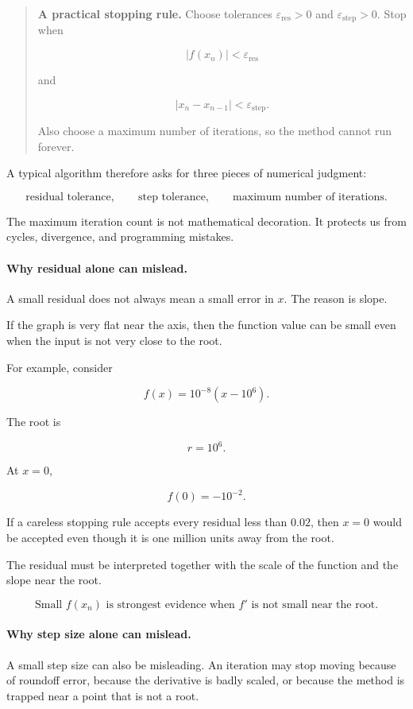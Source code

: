 \begin{quote}
\textbf{A practical stopping rule.}
Choose tolerances \(\varepsilon_{\text{res}}>0\) and \(\varepsilon_{\text{step}}>0\).  Stop when

\[
|f(x_n)|<\varepsilon_{\text{res}}
\]

and

\[
|x_n-x_{n-1}|<\varepsilon_{\text{step}}.
\]

Also choose a maximum number of iterations, so the method cannot run forever.
\end{quote}

A typical algorithm therefore asks for three pieces of numerical judgment:

\[
\text{residual tolerance},\qquad
\text{step tolerance},\qquad
\text{maximum number of iterations}.
\]

The maximum iteration count is not mathematical decoration.  It protects us from
cycles, divergence, and programming mistakes.

\paragraph{Why residual alone can mislead.}
A small residual does not always mean a small error in \(x\).  The reason is slope.

If the graph is very flat near the axis, then the function value can be small even when
the input is not very close to the root.

For example, consider

\[
f(x)=10^{-8}(x-10^6).
\]

The root is

\[
r=10^6.
\]

At \(x=0\),

\[
f(0)=-10^{-2}.
\]

If a careless stopping rule accepts every residual less than \(0.02\), then \(x=0\) would
be accepted even though it is one million units away from the root.

The residual must be interpreted together with the scale of the function and the slope
near the root.

\[
\boxed{
\text{Small \(f(x_n)\) is strongest evidence when \(f'\) is not small near the root.}
}
\]

\paragraph{Why step size alone can mislead.}
A small step size can also be misleading.  An iteration may stop moving because of
roundoff error, because the derivative is badly scaled, or because the method is trapped
near a point that is not a root.

